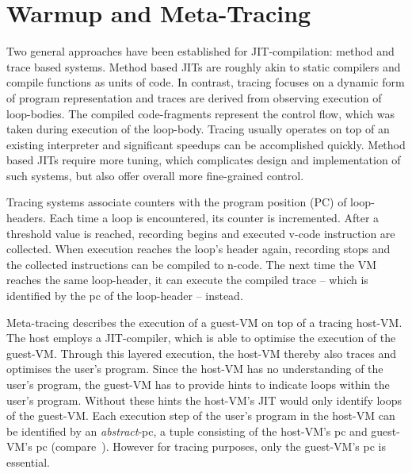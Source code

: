 \section{Warmup and Meta-Tracing}

Two general approaches have been established for JIT-compilation: method and
trace based systems. Method based JITs are roughly akin to static compilers and compile
functions as units of code. In contrast, tracing focuses on a dynamic form of
program representation and traces are derived from observing execution of
loop-bodies. The compiled code-fragments represent the control flow, which was
taken during execution of the loop-body. Tracing usually operates on top of an
existing interpreter and significant speedups can be accomplished quickly.
Method based JITs require more tuning, which complicates design and
implementation of such systems, but also offer overall more fine-grained
control.

Tracing systems associate counters with the program position (PC) of
loop-headers. Each time a loop is encountered, its counter is incremented. After
a threshold value is reached, recording begins and executed v-code instruction
are collected. When execution reaches the loop's header again, recording stops
and the collected instructions can be compiled to n-code. The next time
the VM reaches the same loop-header, it can execute the compiled trace -- which
is identified by the pc of the loop-header -- instead.

Meta-tracing describes the execution of a guest-VM on top of a tracing
host-VM. The host employs a JIT-compiler, which is able to optimise the
execution of the guest-VM. Through this layered execution, the host-VM thereby also
traces and optimises the user's program. Since the host-VM has no understanding
of the user's program, the guest-VM has to provide hints to indicate loops
within the user's program. Without these hints the host-VM's JIT would only
identify loops of the guest-VM. Each execution step of the user's program in the
host-VM can be identified by an \emph{abstract}-pc, a tuple consisting of the
host-VM's pc and guest-VM's pc (compare~\cite{sullivan2003dynamic}). However for
tracing purposes, only the guest-VM's pc is essential.




